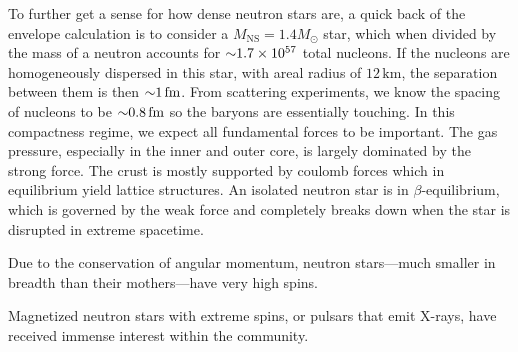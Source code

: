 To further get a sense for how dense neutron stars are, a quick back of the envelope calculation is to consider a $M_\textrm{NS} = 1.4 M _\odot$ star, which when divided by the mass of a neutron accounts for $\mathord{\sim} 1.7 \times 10^{57}$ total nucleons.
If the nucleons are homogeneously dispersed in this star, with areal radius of $12\,\textrm{km}$, the separation between them is then $\mathord{\sim} 1\,\textrm{fm}$.
From scattering experiments, we know the spacing of nucleons to be $\mathord{\sim} 0.8\,\textrm{fm}$ so the baryons are essentially touching.
In this compactness regime, we expect all fundamental forces to be important.
The gas pressure, especially in the inner and outer core, is largely dominated by the strong force.  
The crust is mostly supported by coulomb forces which in equilibrium yield lattice structures.
An isolated neutron star is in $\beta$-equilibrium, which is governed by the weak force and completely breaks down when the star is disrupted in extreme spacetime.



Due to the conservation of angular momentum, neutron stars---much smaller in breadth than their mothers---have very high spins.

Magnetized neutron stars with extreme spins, or pulsars that emit X-rays,
 have received immense interest within the community.


%
%

